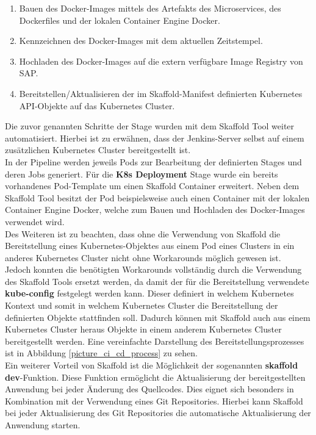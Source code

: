 \begin{enumerate}
	\item Bauen des Docker-Images mittels des Artefakts des Microservices, des Dockerfiles und der lokalen Container Engine Docker.
	\item Kennzeichnen des Docker-Images mit dem aktuellen Zeitstempel.
	\item Hochladen des Docker-Images auf die extern verfügbare Image Registry von SAP.
	\item Bereitstellen/Aktualisieren der im Skaffold-Manifest definierten Kubernetes \ac{API}-Objekte auf das Kubernetes Cluster.
\end{enumerate}
Die zuvor genannten Schritte der Stage wurden mit dem Skaffold Tool weiter automatisiert. 
Hierbei ist zu erwähnen, dass der Jenkins-Server selbst auf einem zusätzlichen Kubernetes Cluster bereitgestellt ist.\\ 
In der Pipeline werden jeweils Pods zur Bearbeitung der definierten Stages und deren Jobs generiert. Für die \textbf{K8s Deployment} Stage wurde ein bereits vorhandenes Pod-Template um einen Skaffold Container erweitert. Neben dem Skaffold Tool besitzt der Pod beispielsweise auch einen Container mit der lokalen Container Engine Docker, welche zum Bauen und Hochladen des Docker-Images verwendet wird.\\
Des Weiteren ist zu beachten, dass ohne die Verwendung von Skaffold die Bereitstellung eines Kubernetes-Objektes aus einem Pod eines Clusters in ein anderes Kubernetes Cluster nicht ohne Workarounds möglich gewesen ist.\\
Jedoch konnten die benötigten Workarounds vollständig durch die Verwendung des Skaffold Tools ersetzt werden, da damit der für die Bereitstellung verwendete \textbf{kube-config} festgelegt werden kann. Dieser definiert in welchem Kubernetes Kontext und somit in welchem Kubernetes Cluster die Bereitstellung der definierten Objekte stattfinden soll.\autocite[Vgl.][]{SkaffoldAuthors.20200116}
Dadurch können mit Skaffold auch aus einem Kubernetes Cluster heraus Objekte in einem anderem Kubernetes Cluster bereitgestellt werden. Eine vereinfachte Darstellung des Bereitstellungsprozesses ist in Abbildung \ref{picture_ci_cd_process} zu sehen.\\
Ein weiterer Vorteil von Skaffold ist die Möglichkeit der sogenannten \textbf{skaffold dev}-Funktion. Diese Funktion ermöglicht die Aktualisierung der bereitgestellten Anwendung bei jeder Änderung des Quellcodes. Dies eignet sich besonders in Kombination mit der Verwendung eines Git Repositories. Hierbei kann Skaffold bei jeder Aktualisierung des Git Repositories die automatische Aktualisierung der Anwendung starten.\autocite[Vgl.][]{SkaffoldAuthors.20200116b}\\
